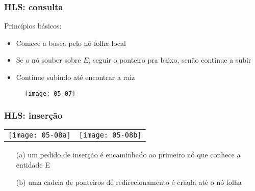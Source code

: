\documentclass[Ligatures=TeX,table,brazil,svgnames,usetotalslideindicator,compress,10pt]{beamer}
\begin{document}
\begin{frame}
  \frametitle{HLS: consulta}
  Princípios básicos:
  \begin{itemize}
  \item Comece a busca pelo nó folha local
  \item Se o nó souber sobre $E$, seguir o ponteiro pra baixo, senão continue a subir
  \item Continue subindo até encontrar a raiz
  \end{itemize}

  \begin{figure}
    \centering
    \texttt{[image: 05-07]}
  \end{figure}
\end{frame}

\begin{frame}
  \frametitle{HLS: inserção}

  \begin{tabular}{cc}
    \texttt{[image: 05-08a]} & \texttt{[image: 05-08b]}
  \end{tabular}

  \begin{block}{}
    \begin{enumerate}
    \item[(a)] um pedido de inserção é encaminhado ao primeiro nó que conhece a entidade E
    \item[(b)] uma cadeia de ponteiros de redirecionamento é criada até o nó folha
    \end{enumerate}
  \end{block}

\end{frame}


\end{document}

